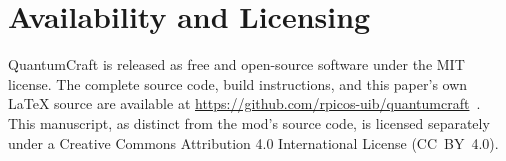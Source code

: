\section*{Availability and Licensing}

QuantumCraft is released as free and open-source software under the MIT license. The
complete source code, build instructions, and this paper's own \LaTeX{} source are available
at \url{https://github.com/rpicos-uib/quantumcraft}~\cite{picos2026quantumcraft}. This
manuscript, as distinct from the mod's source code, is licensed separately under a Creative
Commons Attribution 4.0 International License (CC~BY~4.0).
